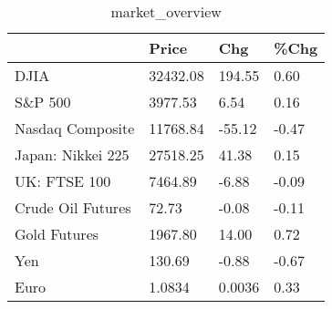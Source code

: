 \documentclass{article}%
\begin{document}
%


\begin{table}[htbp]%
\caption{market\_overview}%
\centering%
\begin{adjustbox}{width=1\textwidth}%
\begin{tabular}{llll}
\toprule
                  &    Price &    Chg &  \%Chg \\
\midrule
             DJIA & 32432.08 & 194.55 &  0.60 \\
          S\&P 500 &  3977.53 &   6.54 &  0.16 \\
 Nasdaq Composite & 11768.84 & -55.12 & -0.47 \\
Japan: Nikkei 225 & 27518.25 &  41.38 &  0.15 \\
     UK: FTSE 100 &  7464.89 &  -6.88 & -0.09 \\
Crude Oil Futures &    72.73 &  -0.08 & -0.11 \\
     Gold Futures &  1967.80 &  14.00 &  0.72 \\
              Yen &   130.69 &  -0.88 & -0.67 \\
             Euro &   1.0834 & 0.0036 &  0.33 \\
\bottomrule
\end{tabular}
%
\end{adjustbox}%
\end{table}

%
\end{document}
